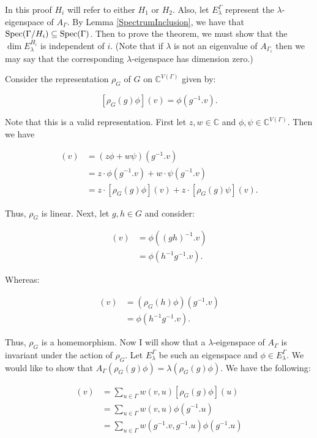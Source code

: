 In this proof $H_i$ will refer to either $H_1$ or $H_2$. Also, let $E_\lambda^{\Gamma}$ represent the $\lambda$-eigenspace of $A_\Gamma$. By Lemma \ref{SpectrumInclusion}, we have that $ \operatorname*{Spec}(\Gamma / H_i) \subseteq \operatorname*{Spec}(\Gamma) $. Then to prove the theorem, we must show that the $\operatorname{dim} E_\lambda^{H_i}$ is independent of $i$. (Note that if $\lambda$ is not an eigenvalue of $A_{\Gamma_i}$ then we may say that the corresponding $\lambda$-eigenspace has dimension zero.)

Consider the representation $\rho_G$ of $G$ on $\mathbb{C}^{V(\Gamma)}$ given by:

$$
[\rho_G(g)\phi](v) = \phi(g^{-1}.v).
$$

Note that this is a valid representation. First let $z,w \in \mathbb{C}$ and $\phi, \psi \in \mathbb{C}^{V(\Gamma)}$. Then we have

\begin{align*}
    [ \rho_G(g)(z \phi + w \psi) ](v) &= (z \phi + w \psi)(g^{-1}.v) \\
    &= z \cdot \phi(g^{-1}.v) + w \cdot \psi(g^{-1}.v) \\
    &= z \cdot [ \rho_G(g)\phi ](v) + z \cdot [ \rho_G(g)\psi ](v).
\end{align*}

Thus, $\rho_G$ is linear. Next, let $g, h \in G$ and consider:

\begin{align*}
    [ \rho_G(gh)\phi ](v) &= \phi((gh)^{-1}.v) \\
    &= \phi(h^{-1}g^{-1}.v).
\end{align*}

Whereas:

\begin{align*}
    [ (\rho_G(g) \circ \rho_G(h))\phi ](v) &= (\rho_G(h)\phi)(g^{-1}.v) \\
    &= \phi(h^{-1}g^{-1}.v).
\end{align*}

Thus, $\rho_G$ is a homemorphism. Now I will show that a $\lambda$-eigenspace of $A_\Gamma$ is invariant under the action of $\rho_G$. Let $E_{\lambda}^{\Gamma}$ be such an eigenspace and $\phi \in E_{\lambda}^{\Gamma}$. We would like to show that $A_\Gamma (\rho_G(g)\phi) = \lambda (\rho_G(g)\phi)$. We have the following:

\begin{align*}
[A_\Gamma (\rho_G(g)\phi)](v) &= \sum_{u \in \Gamma} w(v, u)[ \rho_G(g)\phi ](u) \\
&= \sum_{u \in \Gamma} w(v, u)\phi(g^{-1}.u) \\
&= \sum_{u \in \Gamma} w(g^{-1}.v, g^{-1}.u)\phi(g^{-1}.u)
\end{align*}

